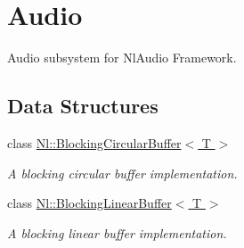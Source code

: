 \hypertarget{group__Audio}{}\section{Audio}
\label{group__Audio}


Audio subsystem for Nl\+Audio Framework.  


\subsection*{Data Structures}
\begin{DoxyCompactItemize}
\item 
class \hyperlink{classNl_1_1BlockingCircularBuffer}{Nl\+::\+Blocking\+Circular\+Buffer$<$ T $>$}
\begin{DoxyCompactList}\small\item\em A blocking circular buffer implementation. \end{DoxyCompactList}\item 
class \hyperlink{classNl_1_1BlockingLinearBuffer}{Nl\+::\+Blocking\+Linear\+Buffer$<$ T $>$}
\begin{DoxyCompactList}\small\item\em A blocking linear buffer implementation. \end{DoxyCompactList}\end{DoxyCompactItemize}
